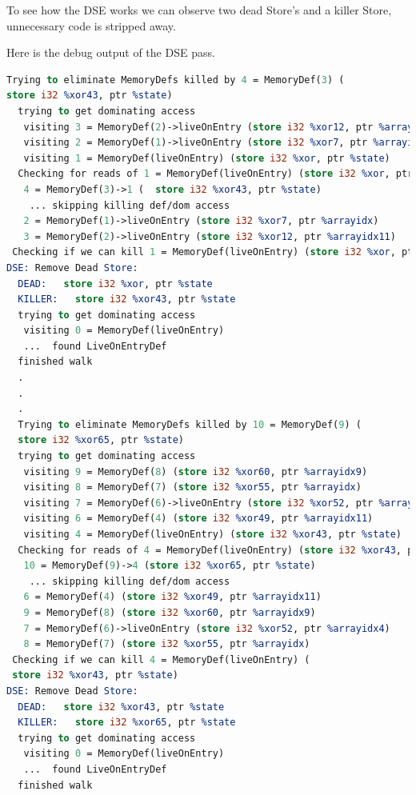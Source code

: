 



To see how the DSE works we can observe two dead Store's and a killer Store, unnecessary code is stripped away.



Here is the debug output of the DSE pass.

\begin{lstlisting}[language=llvm, style=nasm]
Trying to eliminate MemoryDefs killed by 4 = MemoryDef(3) (
store i32 %xor43, ptr %state)
  trying to get dominating access
   visiting 3 = MemoryDef(2)->liveOnEntry (store i32 %xor12, ptr %arrayidx11)
   visiting 2 = MemoryDef(1)->liveOnEntry (store i32 %xor7, ptr %arrayidx)
   visiting 1 = MemoryDef(liveOnEntry) (store i32 %xor, ptr %state)
  Checking for reads of 1 = MemoryDef(liveOnEntry) (store i32 %xor, ptr %state)
   4 = MemoryDef(3)->1 (  store i32 %xor43, ptr %state)
    ... skipping killing def/dom access
   2 = MemoryDef(1)->liveOnEntry (store i32 %xor7, ptr %arrayidx)
   3 = MemoryDef(2)->liveOnEntry (store i32 %xor12, ptr %arrayidx11)
 Checking if we can kill 1 = MemoryDef(liveOnEntry) (store i32 %xor, ptr %state)
DSE: Remove Dead Store:
  DEAD:   store i32 %xor, ptr %state
  KILLER:   store i32 %xor43, ptr %state
  trying to get dominating access
   visiting 0 = MemoryDef(liveOnEntry)
   ...  found LiveOnEntryDef
  finished walk
  .
  .
  .
  Trying to eliminate MemoryDefs killed by 10 = MemoryDef(9) (
  store i32 %xor65, ptr %state)
  trying to get dominating access
   visiting 9 = MemoryDef(8) (store i32 %xor60, ptr %arrayidx9)
   visiting 8 = MemoryDef(7) (store i32 %xor55, ptr %arrayidx)
   visiting 7 = MemoryDef(6)->liveOnEntry (store i32 %xor52, ptr %arrayidx4)
   visiting 6 = MemoryDef(4) (store i32 %xor49, ptr %arrayidx11)
   visiting 4 = MemoryDef(liveOnEntry) (store i32 %xor43, ptr %state)
  Checking for reads of 4 = MemoryDef(liveOnEntry) (store i32 %xor43, ptr %state)
   10 = MemoryDef(9)->4 (store i32 %xor65, ptr %state)
    ... skipping killing def/dom access
   6 = MemoryDef(4) (store i32 %xor49, ptr %arrayidx11)
   9 = MemoryDef(8) (store i32 %xor60, ptr %arrayidx9)
   7 = MemoryDef(6)->liveOnEntry (store i32 %xor52, ptr %arrayidx4)
   8 = MemoryDef(7) (store i32 %xor55, ptr %arrayidx)
 Checking if we can kill 4 = MemoryDef(liveOnEntry) (
 store i32 %xor43, ptr %state)
DSE: Remove Dead Store:
  DEAD:   store i32 %xor43, ptr %state
  KILLER:   store i32 %xor65, ptr %state
  trying to get dominating access
   visiting 0 = MemoryDef(liveOnEntry)
   ...  found LiveOnEntryDef
  finished walk
\end{lstlisting}

